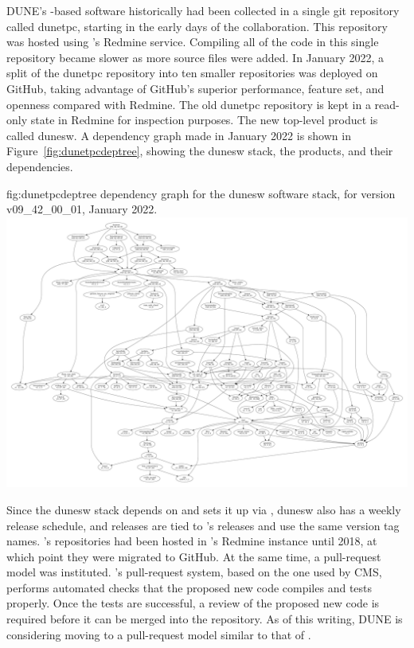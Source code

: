 \documentclass[../main-v1.tex]{subfiles}
\begin{document}
DUNE's -based software historically had been collected in a single git repository called dunetpc, starting in the early days of the collaboration.  This repository was hosted using 's Redmine service.  Compiling all of the code in this single repository became slower as more source files were added.  In January 2022, a split of the dunetpc repository into ten smaller repositories was deployed on GitHub, taking advantage of GitHub's superior performance, feature set, and openness compared with Redmine.  The old dunetpc repository is kept in a read-only state in Redmine for inspection purposes.  The new top-level product is called dunesw.  A  dependency graph made in January 2022 is shown in Figure~\ref{fig:dunetpcdeptree}, showing the dunesw stack, the   products, and their dependencies.

\begin{dunefigure}
{fig:dunetpcdeptree}
{ dependency graph for the dunesw software stack, for version v09\_42\_00\_01, January 2022.}
\includegraphics[width=\textwidth]{graphics/CodeManagementFigures/dunesw_v09_42_00_01_graph.pdf}
\end{dunefigure}

Since the dunesw stack depends on  and sets it up via , dunesw also has a weekly release schedule, and releases are tied to 's releases and use the same version tag names.  's repositories had been hosted in 's Redmine instance until 2018, at which point they were migrated to GitHub.  At the same time, a pull-request model was instituted.  's pull-request system, based on the one used by CMS, performs automated checks that the proposed new code compiles and tests properly.  Once the tests are successful, a review of the proposed new code is required before it can be merged into the repository.  As of this writing, DUNE is considering moving to a pull-request model similar to that of .
\end{document}
